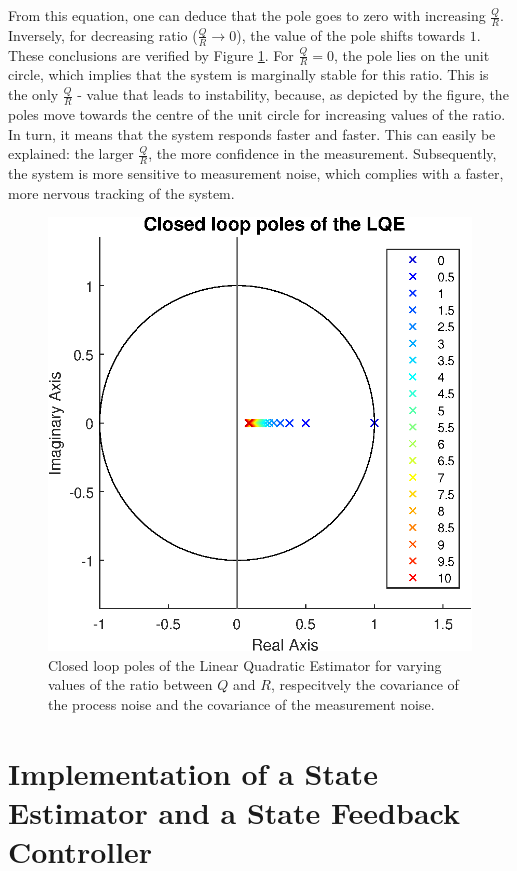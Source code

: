 \documentclass[a4paper,kul]{kulakarticle} %
\begin{document}
\noindent From this equation, one can deduce that the pole goes to zero with increasing $\frac{Q}{R}$. Inversely, for decreasing ratio ($\frac{Q}{R} \rightarrow 0$), the value of the pole shifts towards $1$. These conclusions are verified by Figure \ref{fig:poles_LQE}. For $\frac{Q}{R} = 0$, the pole lies on the unit circle, which implies that the system is marginally stable for this ratio. This is the only $\frac{Q}{R}$ - value that leads to instability, because, as depicted by the figure, the poles move towards the centre of the unit circle for increasing values of the ratio. In turn, it means that the system responds faster and faster. This can easily be explained: the larger $\frac{Q}{R}$, the more confidence in the measurement. Subsequently, the system is more sensitive to measurement noise, which complies with a faster, more nervous tracking of the system.

\begin{figure}[htp!]
	\centering
	\includegraphics[width=0.5\linewidth]{poles_LQE.eps}
	\caption{Closed loop poles of the Linear Quadratic Estimator for varying values of the ratio between $Q$ and $R$, respecitvely the covariance of the process noise and the covariance of the measurement noise.}
	\label{fig:poles_LQE}
\end{figure}



\newpage
\section{Implementation of a State Estimator and a State Feedback Controller}
\end{document}
